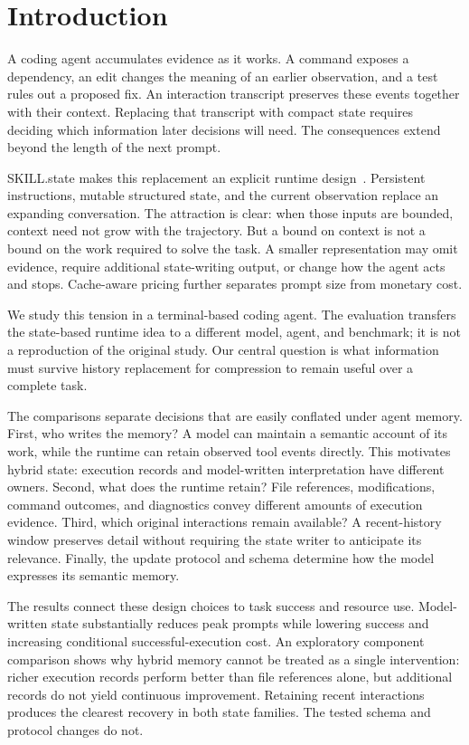 \section{Introduction}
\label{sec:introduction}

A coding agent accumulates evidence as it works. A command exposes a
dependency, an edit changes the meaning of an earlier observation, and a
test rules out a proposed fix. An interaction transcript preserves these
events together with their context. Replacing that transcript with compact
state requires deciding which information later decisions will need.
The consequences extend beyond the length of the next prompt.

SKILL.state makes this replacement an explicit runtime
design~\citep{skillstate2026}. Persistent instructions, mutable structured
state, and the current observation replace an expanding conversation.
The attraction is clear: when those inputs are bounded, context need not
grow with the trajectory. But a bound on context is not a bound on the
work required to solve the task. A smaller representation may omit evidence,
require additional state-writing output, or change how the agent acts and
stops. Cache-aware pricing further separates prompt size from monetary cost.

We study this tension in a terminal-based coding agent. The evaluation
transfers the state-based runtime idea to a different model, agent, and
benchmark; it is not a reproduction of the original study. Our central
question is what information must survive history replacement for
compression to remain useful over a complete task.

The comparisons separate decisions that are easily conflated under
agent memory. First, who writes the memory? A model can maintain a
semantic account of its work, while the runtime can retain observed tool
events directly. This motivates hybrid state: execution records and
model-written interpretation have different owners. Second, what does the
runtime retain? File references, modifications, command outcomes, and
diagnostics convey different amounts of execution evidence. Third, which
original interactions remain available? A recent-history window preserves
detail without requiring the state writer to anticipate its relevance.
Finally, the update protocol and schema determine how the model expresses
its semantic memory.

The results connect these design choices to task success and resource use.
Model-written state substantially reduces peak prompts while lowering
success and increasing conditional successful-execution cost. An
exploratory component comparison shows why hybrid memory cannot be treated
as a single intervention: richer execution records perform better than
file references alone, but additional records do not yield continuous
improvement. Retaining recent interactions produces the clearest recovery
in both state families. The tested schema and protocol changes do not.

